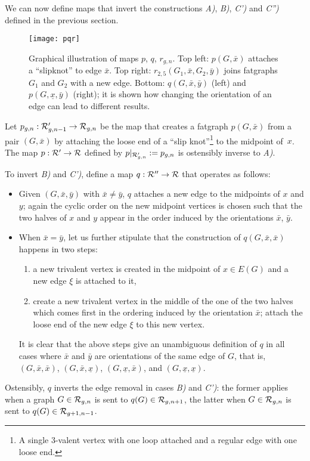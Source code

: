 We can now define maps that invert the constructions {\slshape A)}, {\slshape B)},
{\slshape C')} and {\slshape C'')} defined in the previous section.
\begin{figure}
  \centering
  \texttt{[image: pqr]}
  \caption{Graphical illustration of maps $p$, $q$, $r_{g,n}$.  Top left: $p(G,\bar{x})$ attaches a ``slipknot'' to edge $\bar{x}$.  Top right: $r_{2,5}(G_1, \bar{x}, G_2, \bar{y})$ joins fatgraphs $G_1$ and $G_2$ with a new edge. Bottom: $q(G,\bar{x}, \bar{y})$ (left) and $p(G, \underline{x}, \bar{y})$ (right); it is shown how changing the orientation of an edge can lead to different results.}
  \label{fig:pqr}
\end{figure}

Let $p_{g,n} : \mathcal{R}'_{g,n-1} \to \mathcal{R}_{g,n}$ be the map that creates a
fatgraph $p(G,\bar{x})$ from a pair $(G, \bar{x})$ by attaching the
loose end of a ``slip knot''\footnote{A single 3-valent vertex with
  one loop attached and a regular edge with one loose end.} to the
midpoint of~$x$. The map $p: \mathcal{R}' \to \mathcal{R}$ defined by $p|_{\mathcal{R}'_{g,n}} := p_{g,n}$
is ostensibly inverse to {\slshape A)}.

To invert {\slshape B)} and {\slshape C')}, define a map $q : \mathcal{R}'' \to \mathcal{R}$ that
operates as follows:
\begin{itemize}
\item Given $(G, \bar{x}, \bar{y})$ with $\bar{x} \not= \bar{y}$, $q$
  attaches a new edge to the midpoints of $x$ and $y$; again the
  cyclic order on the new midpoint vertices is chosen such that the
  two halves of $x$ and $y$ appear in the order induced by the
  orientations $\bar x$, $\bar y$.
\item When $\bar{x} = \bar{y}$, let us further stipulate that the
  construction of $q(G, \bar{x}, \bar{x})$ happens in two steps:
  \begin{enumerate}
  \item a new trivalent vertex is created in the midpoint of $x \in
    E(G)$ and a new edge $\xi$ is attached to it,
  \item create a new trivalent vertex in the middle of the one of the
    two halves which comes first in the ordering induced by the
    orientation $\bar{x}$; attach the loose end of the new edge $\xi$
    to this new vertex.
  \end{enumerate}
  It is clear that the above steps give an unambiguous definition of
  $q$ in all cases where $\bar{x}$ and $\bar{y}$ are orientations of
  the same edge of $G$, that is, $(G, \bar{x}, \bar{x})$, $(G,
  \bar{x}, \underline{x})$, $(G, \underline{x}, \bar{x})$, and $(G,
  \underline{x}, \underline{x})$.
\end{itemize}
Ostensibly, $q$ inverts the edge removal in cases {\slshape B)} and
{\slshape C')}: the former applies when a graph $G \in \mathcal{R}_{g,n}$ is
sent to $q(G) \in \mathcal{R}_{g,n+1}$, the latter when $G \in \mathcal{R}_{g,n}$ is
sent to $q(G) \in \mathcal{R}_{g+1,n-1}$.

